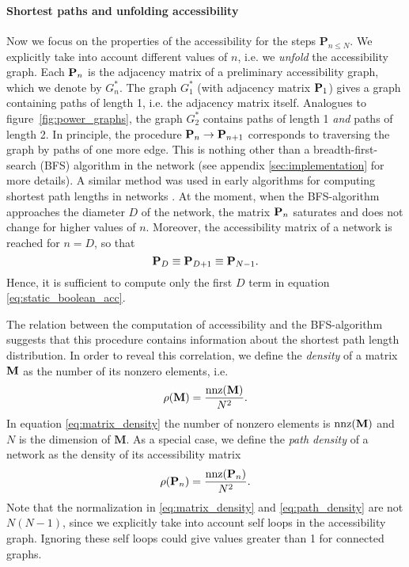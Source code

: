 \paragraph{Shortest paths and unfolding accessibility\color{Cayenne}{.}}
Now we focus on the properties of the accessibility for the steps $\mathbf{P}_{n\leq N}$.
We explicitly take into account different values of $n$, i.e. we \emph{unfold} the accessibility graph.
Each $\mathbf{P}_n$ is the adjacency matrix of a preliminary accessibility graph, which we denote by $G_n ^*$.
The graph $G_1 ^*$ (with adjacency matrix $\mathbf{P}_1$) gives a graph containing paths of length 1, i.e. the adjacency matrix itself.
Analogues to figure~\ref{fig:power_graphs}, the graph $G_2 ^*$ contains paths of length 1 \emph{and} paths of length 2.
In principle, the procedure $\mathbf{P}_n \rightarrow \mathbf{P}_{n+1}$ corresponds to traversing the graph by paths of one more edge.
This is nothing other than a breadth-first-search (BFS) algorithm in the network (see appendix \ref{sec:implementation} for more details).
A similar method was used in early algorithms for computing shortest path lengths in networks \citep{Floyd:1962vo,Warshall:1962wr}.
At the moment, when the BFS-algorithm approaches the diameter $D$ of the network, the matrix $\mathbf{P}_n$ saturates and does not change for higher values of $n$.
Moreover, the accessibility matrix of a network is reached for $n=D$, so that
\begin{equation}\label{eq:diameter_sat}
\mathbf{P}_{D}\equiv \mathbf{P}_{D+1}\equiv \mathbf{P}_{N-1}.
\end{equation}
Hence, it is sufficient to compute only the first $D$ term in equation \eqref{eq:static_boolean_acc}.

The relation between the computation of accessibility and the BFS-algorithm suggests that this procedure contains information about the shortest path length distribution.
In order to reveal this correlation, we define the \emph{density} of a matrix $\mathbf{M}$ as the number of its nonzero elements, i.e.
\begin{equation}\label{eq:matrix_density}
\rho (\mathbf{M}) =\frac{\mathrm{nnz}(\mathbf{M})}{N^2}.
\end{equation}
In equation \eqref{eq:matrix_density} the number of nonzero elements is $\mathrm{nnz}(\mathbf{M})$ and $N$ is the dimension of $\mathbf{M}$.
As a special case, we define the \emph{path density} of a  network as the density of its accessibility matrix
\begin{equation}\label{eq:path_density}
\rho (\mathbf{P}_n) =\frac{\mathrm{nnz}(\mathbf{P}_n)}{N^2}.
\end{equation}
Note that the normalization in \eqref{eq:matrix_density} and \eqref{eq:path_density} are not $N(N-1)$, since we explicitly take into account self loops in the accessibility graph.
Ignoring these self loops could give values greater than 1 for connected graphs.

